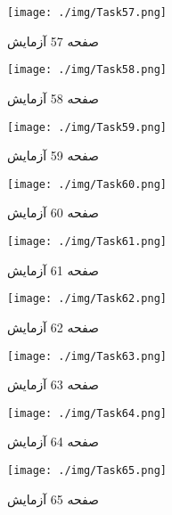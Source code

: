  
\begin{figure}[htpb]
\centering
\texttt{[image: ./img/Task57.png]}
\caption{ صفحه 57 آزمایش }
\label{fig:Task57}
\end{figure}
 
 
\begin{figure}[htpb]
\centering
\texttt{[image: ./img/Task58.png]}
\caption{ صفحه 58 آزمایش }
\label{fig:Task58}
\end{figure}
 
 
\begin{figure}[htpb]
\centering
\texttt{[image: ./img/Task59.png]}
\caption{ صفحه 59 آزمایش }
\label{fig:Task59}
\end{figure}
 
 
\begin{figure}[htpb]
\centering
\texttt{[image: ./img/Task60.png]}
\caption{ صفحه 60 آزمایش }
\label{fig:Task60}
\end{figure}
 
 
\begin{figure}[htpb]
\centering
\texttt{[image: ./img/Task61.png]}
\caption{ صفحه 61 آزمایش }
\label{fig:Task61}
\end{figure}
 
 
\begin{figure}[htpb]
\centering
\texttt{[image: ./img/Task62.png]}
\caption{ صفحه 62 آزمایش }
\label{fig:Task62}
\end{figure}
 
 
\begin{figure}[htpb]
\centering
\texttt{[image: ./img/Task63.png]}
\caption{ صفحه 63 آزمایش }
\label{fig:Task63}
\end{figure}
 
 
\begin{figure}[htpb]
\centering
\texttt{[image: ./img/Task64.png]}
\caption{ صفحه 64 آزمایش }
\label{fig:Task64}
\end{figure}
 
 
\begin{figure}[htpb]
\centering
\texttt{[image: ./img/Task65.png]}
\caption{ صفحه 65 آزمایش }
\label{fig:Task65}
\end{figure}
 
